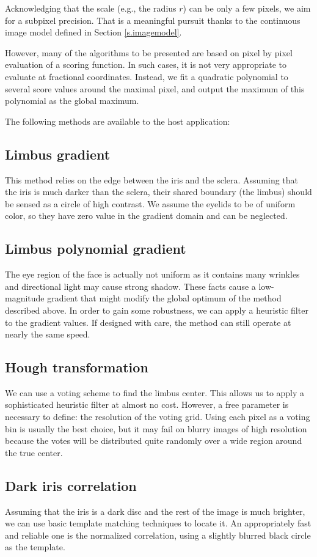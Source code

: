 Acknowledging that the scale (e.g., the radius $r$) can be only a few pixels, we aim for a subpixel precision.
That is a meaningful pursuit thanks to the continuous image model defined in Section \ref{s.imagemodel}.

However, many of the algorithms to be presented are based on pixel by pixel evaluation of a scoring function.
In such cases, it is not very appropriate to evaluate at fractional coordinates.
Instead, we fit a quadratic polynomial to several score values around the maximal pixel, and output the maximum of this polynomial as the global maximum.

The following methods are available to the host application:

\subsection{Limbus gradient}
This method relies on the edge between the iris and the sclera.
Assuming that the iris is much darker than the sclera, their shared boundary (the limbus) should be sensed as a circle of high contrast.
We assume the eyelids to be of uniform color, so they have zero value in the gradient domain and can be neglected.

\subsection{Limbus polynomial gradient}
The eye region of the face is actually not uniform as it contains many wrinkles and directional light may cause strong shadow.
These facts cause a low-magnitude gradient that might modify the global optimum of the method described above.
In order to gain some robustness, we can apply a heuristic filter to the gradient values.
If designed with care, the method can still operate at nearly the same speed.

\subsection{Hough transformation}
We can use a voting scheme to find the limbus center.
This allows us to apply a sophisticated heuristic filter at almost no cost.
However, a free parameter is necessary to define: the resolution of the voting grid.
Using each pixel as a voting bin is usually the best choice, but it may fail on blurry images of high resolution because the votes will be distributed quite randomly over a wide region around the true center.

\subsection{Dark iris correlation}
Assuming that the iris is a dark disc and the rest of the image is much brighter, we can use basic template matching techniques to locate it.
An appropriately fast and reliable one is the normalized correlation, using a slightly blurred black circle as the template.

